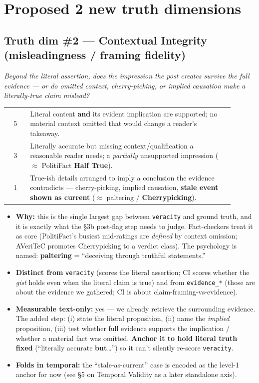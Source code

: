 \documentclass[11pt]{article}
\begin{document}
\hrulefill

\section{Proposed 2 new truth dimensions}

\subsection*{Truth dim \#2 --- Contextual Integrity (misleadingness / framing fidelity)}
\emph{Beyond the literal assertion, does the impression the post creates survive the full
evidence --- or do omitted context, cherry-picking, or implied causation make a
literally-true claim mislead?}

\begin{longtable}{@{}c>{\raggedright\arraybackslash}p{0.9\linewidth}@{}}
\toprule
5 & Literal content \textbf{and} its evident implication are supported; no material context
omitted that would change a reader's takeaway. \\
3 & Literally accurate but missing context/qualification a reasonable reader needs; a
\emph{partially} unsupported impression ($\approx$ PolitiFact \textbf{Half True}). \\
1 & True-ish details arranged to imply a conclusion the evidence contradicts ---
cherry-picking, implied causation, \textbf{stale event shown as current} ($\approx$ paltering
/ \textbf{Cherrypicking}). \\
\bottomrule
\end{longtable}

\begin{itemize}[leftmargin=1.4em]
  \item \textbf{Why:} this is the single largest gap between \texttt{veracity} and ground
    truth, and it is exactly what the \S3b post-flag step needs to judge. Fact-checkers treat
    it as core (PolitiFact's busiest mid-ratings are \emph{defined} by context omission;
    AVeriTeC promotes Cherrypicking to a verdict class). The psychology is named:
    \textbf{paltering} = ``deceiving through truthful statements.''
  \item \textbf{Distinct from} \texttt{veracity} (scores the literal assertion; CI scores
    whether the \emph{gist} holds even when the literal claim is true) and from
    \texttt{evidence\_*} (those are about the evidence we gathered; CI is about
    claim-framing-vs-evidence).
  \item \textbf{Measurable text-only:} yes --- we already retrieve the surrounding evidence.
    The added step: (i) state the literal proposition, (ii) name the \emph{implied}
    proposition, (iii) test whether full evidence supports the implication / whether a
    material fact was omitted. \textbf{Anchor it to hold literal truth fixed} (``literally
    accurate \textbf{but}\ldots'') so it can't silently re-score \texttt{veracity}.
  \item \textbf{Folds in temporal:} the ``stale-as-current'' case is encoded as the level-1
    anchor for now (see \S5 on Temporal Validity as a later standalone axis).
\end{itemize}
\end{document}
